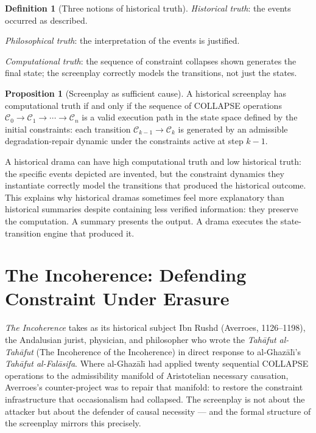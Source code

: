 \documentclass[11pt, a4paper]{article}
\theoremstyle{definition}
\newtheorem{definition}{Definition}
\newtheorem{proposition}{Proposition}
\theoremstyle{remark}
\begin{document}
\begin{definition}[Three notions of historical truth]
\textit{Historical truth}: the events occurred as described.

\textit{Philosophical truth}: the interpretation of the events is justified.

\textit{Computational truth}: the sequence of constraint collapses shown
generates the final state; the screenplay correctly models the transitions,
not just the states.
\end{definition}

\begin{proposition}[Screenplay as sufficient cause]
A historical screenplay has computational truth if and only if the sequence
of COLLAPSE operations $\mathcal{C}_0 \to \mathcal{C}_1 \to \cdots \to
\mathcal{C}_n$ is a valid execution path in the state space defined by the
initial constraints: each transition $\mathcal{C}_{k-1} \to \mathcal{C}_k$
is generated by an admissible degradation-repair dynamic under the constraints
active at step $k-1$.
\end{proposition}

A historical drama can have high computational truth and low historical truth:
the specific events depicted are invented, but the constraint dynamics they
instantiate correctly model the transitions that produced the historical
outcome. This explains why historical dramas sometimes feel more explanatory
than historical summaries despite containing less verified information: they
preserve the computation. A summary presents the output. A drama executes the
state-transition engine that produced it.

\section{The Incoherence: Defending Constraint Under Erasure}

\textit{The Incoherence} takes as its historical subject Ibn Rushd (Averroes,
1126--1198), the Andalusian jurist, physician, and philosopher who wrote the
\textit{Tah\={a}fut al-Tah\={a}fut} (The Incoherence of the Incoherence) in
direct response to al-Ghaz\={a}l{\=\i}'s \textit{Tah\={a}fut al-Fal\={a}sifa}.
Where al-Ghaz\={a}l{\=\i} had applied twenty sequential COLLAPSE operations to
the admissibility manifold of Aristotelian necessary causation, Averroes's
counter-project was to repair that manifold: to restore the constraint
infrastructure that occasionalism had collapsed. The screenplay is not about
the attacker but about the defender of causal necessity --- and the formal
structure of the screenplay mirrors this precisely.
\end{document}
